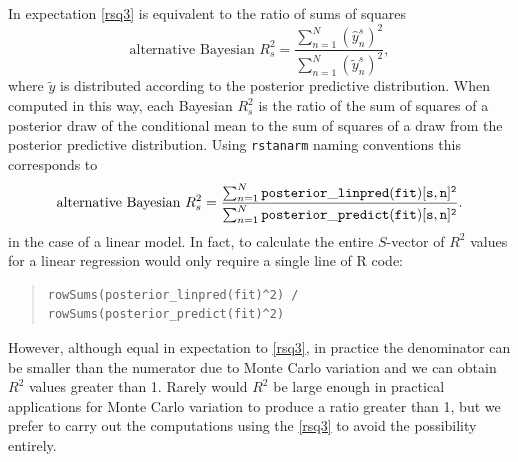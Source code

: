 \documentclass[11pt]{article}
\begin{document}
In expectation \eqref{rsq3} is equivalent to the ratio of sums of squares
%
\begin{equation}\label{rsq4}
\mbox{alternative Bayesian } R^2_s = 
	 \frac{\sum_{n=1}^N (\hat{y}_n^s)^2}{\sum_{n=1}^N (\tilde{y}_n^s)^2},
\end{equation}
%
where $\tilde{y}$ is distributed according to the posterior predictive distribution. 
When computed in this way, each Bayesian $R^2_s$ is the ratio of the sum of 
squares of a posterior draw of the conditional mean to the sum of squares of a 
draw from the posterior predictive distribution. Using {\tt rstanarm} naming 
conventions this corresponds to 
%
\begin{equation*}
\mbox{alternative Bayesian } R^2_s = 
	\frac{\sum_{n=1}^N {\tt posterior\_linpred(fit)[s, n]^2}}{\sum_{n=1}^N{\tt posterior\_predict(fit)[s, n]^2}}.
\end{equation*}
%
in the case of a linear model. In fact, to calculate the entire $S$-vector of $R^2$ values for a linear 
regression would only require a single line of R code:
%
\vspace{-\baselineskip}
\begin{quotation}
\noindent
\begin{small}
\begin{verbatim}
rowSums(posterior_linpred(fit)^2) / rowSums(posterior_predict(fit)^2)
\end{verbatim}
\end{small}
\end{quotation}
%
However, although equal in expectation to \eqref{rsq3}, in practice the denominator 
can be smaller than the numerator due to Monte Carlo variation and we can obtain  
$R^2$ values greater than 1. Rarely would $R^2$ be large enough in practical 
applications for Monte Carlo variation to produce a ratio greater than 1, but we
prefer to carry out the computations using the \eqref{rsq3} to avoid the 
possibility entirely. 
\end{document}
